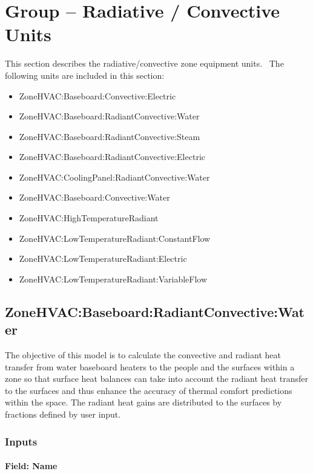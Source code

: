 \section{Group -- Radiative \textbf{/} Convective Units}\label{group-radiative-convective-units}

This section describes the radiative/convective zone equipment units.~ The following units are included in this section:

\begin{itemize}
\item
  ZoneHVAC:Baseboard:Convective:Electric
\item
  ZoneHVAC:Baseboard:RadiantConvective:Water
\item
  ZoneHVAC:Baseboard:RadiantConvective:Steam
\item
  ZoneHVAC:Baseboard:RadiantConvective:Electric
\item
  ZoneHVAC:CoolingPanel:RadiantConvective:Water
\item
  ZoneHVAC:Baseboard:Convective:Water
\item
  ZoneHVAC:HighTemperatureRadiant
\item
  ZoneHVAC:LowTemperatureRadiant:ConstantFlow
\item
  ZoneHVAC:LowTemperatureRadiant:Electric
\item
  ZoneHVAC:LowTemperatureRadiant:VariableFlow
\end{itemize}

\subsection{ZoneHVAC:Baseboard:RadiantConvective:Water}\label{zonehvacbaseboardradiantconvectivewater}

The objective of this model is to calculate the convective and radiant heat transfer from water baseboard heaters to the people and the surfaces within a zone so that surface heat balances can take into account the radiant heat transfer to the surfaces and thus enhance the accuracy of thermal comfort predictions within the space. The radiant heat gains are distributed to the surfaces by fractions defined by user input.

\subsubsection{Inputs}\label{inputs-038}

\paragraph{Field: Name}\label{field-name-037}

